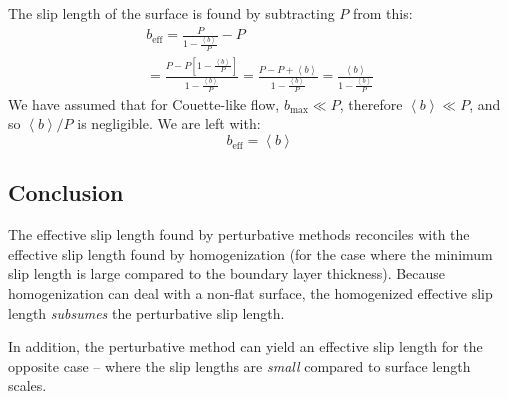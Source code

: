 \documentclass[12pt, a4paper, twoside, openright]{book}
\newcommand{\beff}{\ensuremath{b_{\mathrm{eff}}}}
\newcommand{\bmax}{\ensuremath{b_{\mathrm{max}}}}
\begin{document}
The slip length of the surface is found by subtracting $P$ from this:
\begin{gather}
\beff = \frac{P}{1 - \frac{\left< b \right>}{P}} - P \\
= \frac{P - P \left[ 1 - \frac{\left< b \right>}{P} \right]}{1 - \frac{\left< b \right>}{P}}
= \frac{ P - P + \left< b \right> }{1 - \frac{\left< b \right>}{P}} 
= \frac{\left< b \right> }{1 - \frac{\left< b \right>}{P}}
\end{gather}
We have assumed that for Couette-like flow, $\bmax \ll P$, therefore $ \left< b \right> \ll P$, and so $\left< b \right> / P$ is negligible.  We are left with:
\begin{equation}
\beff = \left< b \right>
\end{equation}

\subsection*{Conclusion}

The effective slip length found by perturbative methods reconciles with the effective slip length found by homogenization (for the case where the minimum slip length is large compared to the boundary layer thickness).  Because homogenization can deal with a non-flat surface, the homogenized effective slip length \emph{subsumes} the perturbative slip length.

In addition, the perturbative method can yield an effective slip length for the opposite case -- where the slip lengths are \emph{small} compared to surface length scales.


%
%
\end{document}
